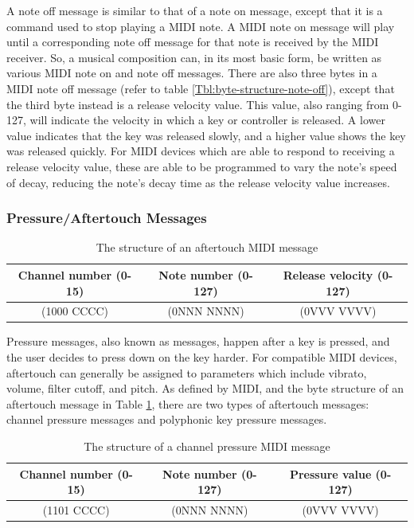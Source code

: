 A note off message is similar to that of a note on message, except that it is a command used to stop playing a MIDI note. A MIDI note on message will play until a corresponding note off message for that note is received by the MIDI receiver. So, a musical composition can, in its most basic form, be written as various MIDI note on and note off messages. There are also three bytes in a MIDI note off message (refer to table \ref{Tbl:byte-structure-note-off}), except that the third byte instead is a release velocity value. This value, also ranging from 0-127, will indicate the velocity in which a key or controller is released. A lower value indicates that the key was released slowly, and a higher value shows the key was released quickly. For MIDI devices which are able to respond to receiving a release velocity value, these are able to be programmed to vary the note's speed of decay, reducing the note's decay time as the release velocity value increases\cite{Kirk_Hunt_2013}. %

\subsubsection{Pressure/Aftertouch Messages}

\begin{table}
	\centering
	\begin{tabular}{|c|c|c|}
	\hline
		Channel number (0-15) & Note number (0-127) & Release velocity (0-127) \\
		\hline
		(1000 CCCC) & (0NNN NNNN) & (0VVV VVVV) \\
	\hline
	\end{tabular}
	\caption{The structure of an aftertouch MIDI message}
	\label{tbl:byte-structure-aftertouch}
\end{table}

Pressure messages, also known as  messages, happen after a key is pressed, and the user decides to press down on the key harder. For compatible MIDI devices, aftertouch can generally be assigned to parameters which include vibrato, volume, filter cutoff, and pitch. As defined by MIDI, and the byte structure of an aftertouch message in Table \ref{tbl:byte-structure-aftertouch}, there are two types of aftertouch messages: channel pressure messages and polyphonic key pressure messages\cite{Huber_2012}. %

\begin{table}
	\centering
	\begin{tabular}{|c|c|c|}
	\hline
		Channel number (0-15) & Note number (0-127) & Pressure value (0-127) \\
		\hline
		(1101 CCCC) & (0NNN NNNN) & (0VVV VVVV) \\
	\hline
	\end{tabular}
	\caption{The structure of a channel pressure MIDI message}
	\label{tbl:byte-structure-channel-pressure-messages}
\end{table}

